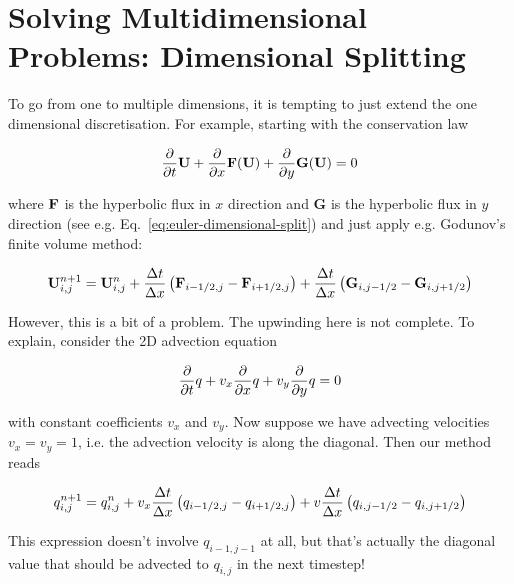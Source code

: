 \newpage
\section{Solving Multidimensional Problems: Dimensional Splitting}
\label{chap:dimensional-splitting}


To go from one to multiple dimensions, it is tempting to just extend the one
dimensional discretisation. For example, starting with the conservation law

\begin{equation}
	\frac{\partial}{\partial t}{\mathbf{U}} + \frac{\partial}{\partial x}{\mathbf{F}(\mathbf{U})} + \frac{\partial}{\partial y} \mathbf{G}(\mathbf{U}) = 0
\end{equation}


where $\mathbf{F}$ is the hyperbolic flux in $x$ direction and $\mathbf{G}$ is the
hyperbolic flux in $y$ direction (see e.g.
Eq.~\ref{eq:euler-dimensional-split}) and just apply e.g. Godunov's finite
volume method:

\begin{equation}
\mathbf{U}_{i,j}^{n+1} =
	\mathbf{U}_{i,j}^n +
	\frac{\Delta t}{\Delta x}
	\left(
		\mathbf{F}_{i - 1/2, j} - \mathbf{F}_{i + 1/2, j}
	\right)
	+ \frac{\Delta t}{\Delta x}
	\left(
		\mathbf{G}_{i ,j - 1/2} - \mathbf{G}_{i, j + 1/2}
	\right)
\end{equation}


However, this is a bit of a problem. The upwinding here is not complete.
To explain, consider the 2D advection equation

\begin{equation}
	\frac{\partial}{\partial t}{q} + v_x \frac{\partial}{\partial x}{q} + v_y \frac{\partial}{\partial y} q = 0
\end{equation}

with constant coefficients $v_x$ and $v_y$. Now suppose we have advecting
velocities $v_x = v_y = 1$, i.e. the advection velocity is along the diagonal.
Then our method reads 

\begin{equation}
q_{i,j}^{n+1} =
	q_{i,j}^n +
	v_x \frac{\Delta t}{\Delta x}
	\left(
		q_{i - 1/2, j} - q_{i + 1/2, j}
	\right)
	+ v \frac{\Delta t}{\Delta x}
	\left(
		q_{i ,j - 1/2} - q_{i, j + 1/2}
	\right)
\end{equation}

This expression doesn't involve $q_{i-1, j-1}$ at all, but that's actually the
diagonal value that should be advected to $q_{i, j}$ in the next timestep!


